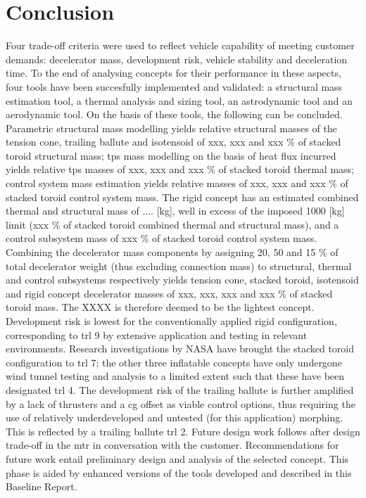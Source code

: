 \section{Conclusion}\label{cha:conclusion}
Four trade-off criteria were used to reflect vehicle capability of meeting customer demands: decelerator mass, development risk, vehicle stability and deceleration time. To the end of analysing concepts for their performance in these aspects, four tools have been succesfully implemented and validated: a structural mass estimation tool, a thermal analysis and sizing tool, an astrodynamic tool and an aerodynamic tool. On the basis of these tools, the following can be concluded.
\newline
\newline
Parametric structural mass modelling yields relative structural masses of the tension cone, trailing ballute and isotensoid of xxx, xxx and xxx \% of stacked toroid structural mass; \acrfull{tps} mass modelling on the basis of heat flux incurred yields relative \gls{tps} masses of xxx, xxx and xxx \% of stacked toroid thermal mass; control system mass estimation yields relative masses of xxx, xxx and xxx \% of stacked toroid control system mass. The rigid concept has an estimated combined thermal and structural mass of .... [kg], well in excess of the imposed 1000 [kg] limit (xxx \% of stacked toroid combined thermal and structural mass), and a control subsystem mass of xxx \% of stacked toroid control system mass. Combining the decelerator mass components by assigning 20, 50 and 15 \% of total decelerator weight (thus excluding connection mass) to structural, thermal and control subsystems respectively yields tension cone, stacked toroid, isotensoid and rigid concept decelerator masses of xxx, xxx, xxx and xxx \% of stacked toroid mass. The XXXX is therefore deemed to be the lightest concept.
\newline
\newline
Development risk is lowest for the conventionally applied rigid configuration, corresponding to \acrfull{trl} 9 by extensive application and testing in relevant environments. Research investigations by NASA have brought the stacked toroid configuration to \gls{trl} 7; the other three inflatable concepts have only undergone wind tunnel testing and analysis to a limited extent such that these have been designated \gls{trl} 4. The development risk of the trailing ballute is further amplified by a lack of thrusters and a \gls{cg} offset as viable control options, thus requiring the use of relatively underdeveloped and untested (for this application) morphing. This is reflected by a trailing ballute \gls{trl} 2.
\newline
{}
\newline
\newline
Future design work follows after design trade-off in the \acrfull{mtr} in conversation with the customer. Recommendations for future work entail preliminary design and analysis of the selected concept. This phase is aided by enhanced versions of the tools developed and described in this Baseline Report. 



